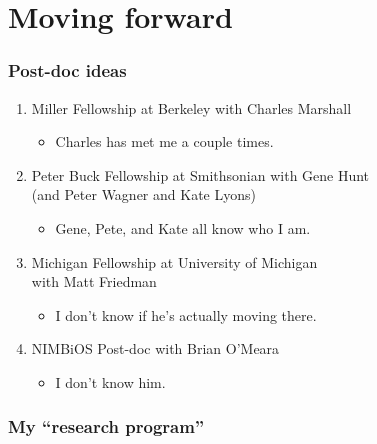 \documentclass{beamer}
\begin{document}
\section{Moving forward}

\begin{frame}
  \frametitle{Post-doc ideas}
  \begin{enumerate}
    \item Miller Fellowship at Berkeley with Charles Marshall
      \begin{itemize}
        \item Charles has met me a couple times.
      \end{itemize}
    \item Peter Buck Fellowship at Smithsonian with Gene Hunt \\(and Peter Wagner and Kate Lyons)
      \begin{itemize}
        \item Gene, Pete, and Kate all know who I am.
      \end{itemize}
    \item Michigan Fellowship at University of Michigan \\with Matt Friedman
      \begin{itemize}
        \item I don't know if he's actually moving there.
      \end{itemize}
    \item NIMBiOS Post-doc with Brian O'Meara
      \begin{itemize}
        \item I don't know him.
      \end{itemize}
  \end{enumerate}
\end{frame}

\begin{frame}
  \frametitle{My ``research program''}
\end{frame}
\end{document}
